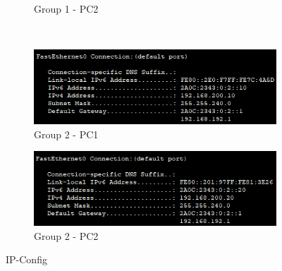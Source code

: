 \begin{figure}[!htb]
\begin{subfigure}{.49\textwidth}
        \caption{Group 1 - PC2}
    \end{subfigure}
    ~
    \begin{subfigure}{.49\textwidth}
        \includegraphics[width=\textwidth,height=.88\textwidth,keepaspectratio]{./img/config/pc2.png}
        \caption{Group 2 - PC1}
    \end{subfigure}
    \begin{subfigure}{.49\textwidth}
        \includegraphics[width=\textwidth,height=.88\textwidth,keepaspectratio]{./img/config/pc3.png}
        \caption{Group 2 - PC2}
    \end{subfigure}
    \caption{IP-Config}
\end{figure}
\FloatBarrier
